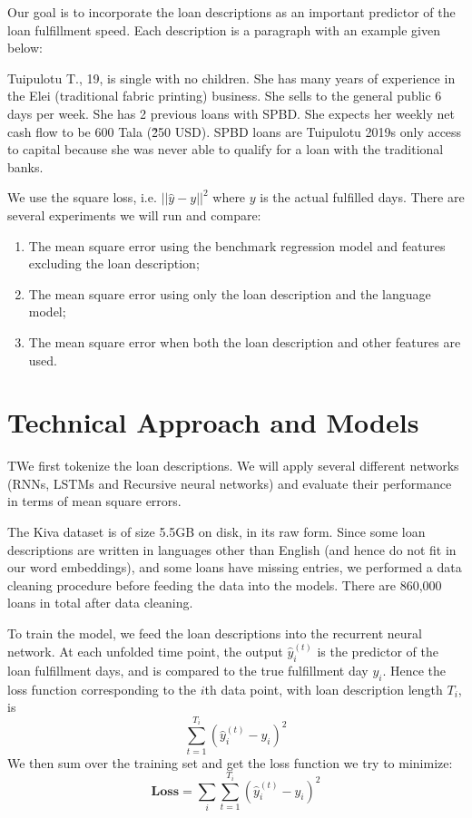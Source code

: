 \documentclass{article} %
\begin{document}
Our goal is to incorporate the loan descriptions as an important predictor of the loan fulfillment speed. Each description is a paragraph with an example given below:

\begin{displayquote}
Tuipulotu T., 19, is single with no children.  She has many years of experience in the Elei (traditional fabric printing) business. She sells to the general public 6 days per week. She has 2 previous loans with SPBD.  She expects her weekly net cash flow to be 600 Tala (\~250 USD).  SPBD loans are Tuipulotu 2019s only access to capital because she was never able to qualify for a loan with the traditional banks.
\end{displayquote}
 

We use the square loss, i.e. $||\hat y-y||^2$ where $y$ is the actual fulfilled days. There are several experiments we will run and compare:
\begin{enumerate}
\item The mean square error using the benchmark regression model and features excluding the loan description;
\item The mean square error using only the loan description and the language model;
\item The mean square error when both the loan description and other features are used.
\end{enumerate}

\section{Technical Approach and Models}
TWe first tokenize the loan descriptions. We will apply several different networks (RNNs, LSTMs and Recursive neural networks) and evaluate their performance in terms of mean square errors. 

The Kiva dataset is of size 5.5GB on disk, in its raw form. Since some loan descriptions are written in languages other than English (and hence do not fit in our word embeddings), and some loans have missing entries, we performed a data cleaning procedure before feeding the data into the models. There are 860,000 loans in total after data cleaning.

To train the model, we feed the loan descriptions into the recurrent neural network. At each unfolded time point, the output $\hat y_i^{(t)}$ is the predictor of the loan fulfillment days, and is compared to the true fulfillment day $y_i$. Hence the loss function corresponding to the $i$th data point, with loan description length $T_i$, is
\[\sum_{t=1}^{T_i}(\hat y_i^{(t)}-y_i)^2\]
We then sum over the training set and get the loss function we try to minimize:
\[\textbf{Loss}=\sum_i\sum_{t=1}^{T_i}(\hat y_i^{(t)}-y_i)^2\]
\end{document}
